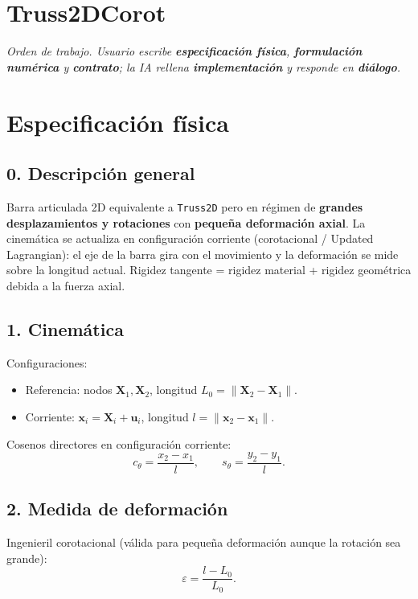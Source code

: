 \documentclass[11pt,letterpaper,oneside]{report}
\begin{document}
\newpage

\section{Truss2DCorot}



\textit{Orden de trabajo. Usuario escribe \textbf{especificación física}, \textbf{formulación numérica} y \textbf{contrato}; la IA rellena \textbf{implementación} y responde en \textbf{diálogo}.}



\section{Especificación física}

\subsection{0. Descripción general}
Barra articulada 2D equivalente a \texttt{Truss2D} pero en régimen de \textbf{grandes desplazamientos y rotaciones} con \textbf{pequeña deformación axial}. La cinemática se actualiza en configuración corriente (corotacional / Updated Lagrangian): el eje de la barra gira con el movimiento y la deformación se mide sobre la longitud actual. Rigidez tangente = rigidez material + rigidez geométrica debida a la fuerza axial.

\subsection{1. Cinemática}
Configuraciones:
\begin{itemize}
  \item Referencia: nodos $\mathbf X_1, \mathbf X_2$, longitud $L_0 = \|\mathbf X_2 - \mathbf X_1\|$.
  \item Corriente: $\mathbf x_i = \mathbf X_i + \mathbf u_i$, longitud $l = \|\mathbf x_2 - \mathbf x_1\|$.
\end{itemize}

Cosenos directores en configuración corriente:
\[
c_\theta = \frac{x_2 - x_1}{l}, \qquad s_\theta = \frac{y_2 - y_1}{l}.
\]

\subsection{2. Medida de deformación}
Ingenieril corotacional (válida para pequeña deformación aunque la rotación sea grande):
\[
\varepsilon = \frac{l - L_0}{L_0}.
\]
\end{document}
